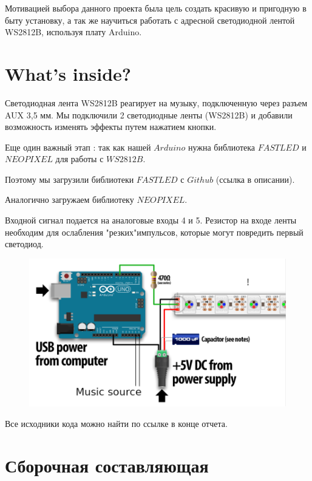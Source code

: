 \documentclass[a4paper, 12pt]{article}%
\begin{document}
Мотивацией выбора данного проекта была цель создать красивую и пригодную в быту установку, а так же научиться работать с адресной светодиодной лентой WS2812B, используя плату Arduino.


\section{What's inside?}

Светодиодная лента WS2812B реагирует на музыку, подключенную через разъем AUX 3,5 мм. Мы подключили 2 светодиодные ленты (WS2812B) и добавили возможность изменять эффекты путем нажатием кнопки.


Еще один важный этап : так как нашей $Arduino$ нужна библиотека $FAST LED$ и $NEOPIXEL$ для работы с $WS2812B$.

Поэтому мы загрузили библиотеки $FAST LED$ с $Github$ (ссылка в описании).

Аналогично загружаем библиотеку $NEOPIXEL$. 

Входной сигнал подается на аналоговые входы 4 и 5. Резистор на входе ленты необходим для ослабления "резких"импульсов, которые могут повредить первый светодиод.

\begin{figure}[!h]
\begin{center}
\includegraphics[scale=0.5]{pictures/scheme.png}
\end{center}
\end{figure}

Все исходники кода можно найти по ссылке в конце отчета.

\section{Сборочная составляющая}
\end{document}
